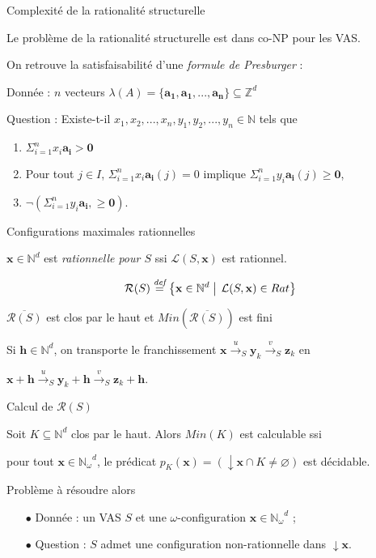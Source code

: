 \documentclass[french]{beamer}
\newcommand{\set}[2]{\left\{#1\mathrel{\left|\vphantom{#1}\vphantom{#2}\right.}#2\right\}}
\newcommand{\defeq}{\ensuremath{\stackrel{\textit{def}}{=}}}
\let\vide\varnothing
\newcommand{\Min}{\textit{Min}}
\newcommand{\N}{\ensuremath{\mathbb{N}}}
\newcommand{\Z}{\ensuremath{\mathbb{Z}}}
\newcommand{\Nomega}{\ensuremath{\mathbb{N}_\omega}}
\newcommand{\lang}{\ensuremath{\mathcal{L}}}
\newcommand{\trans}[2]{\ensuremath{\stackrel{#1}{\longrightarrow}_{#2}}}
\newcommand{\vect}[1]{\ensuremath{\mathbf{#1}}}
\newcommand{\inirat}{\mathcal{R}}
\let\oldemph\emph
\renewcommand{\emph}[1]{\oldemph{\color{blue}#1}}
\begin{document}
\begin{frame}{Complexité de la rationalité structurelle}
\begin{theorem}
Le  problème de la rationalité structurelle est dans co-NP pour les VAS.
\end{theorem}

On retrouve la satisfaisabilité d'une \emph{formule de Presburger} :

\vspace{3mm}
Donnée : $n$ vecteurs $\lambda(A)=\{\vect{a_1}, \vect{a_1}, ..., \vect{a_n}\} \subseteq \Z^d$

Question : Existe-t-il $x_1,x_2,...,x_n, y_1,y_2,...,y_n \in\N$ tels que
\begin{enumerate}
    \item $\Sigma_{i=1}^n x_i \vect{a_i} > \vect{0}$
    \item Pour tout $j \in I$, $\Sigma_{i=1}^n x_i \vect{a_i}(j)=0$ implique $\Sigma_{i=1}^n y_i \vect{a_i}(j) \geq \vect{0}$,
    \item  $\lnot(\Sigma_{i=1}^n y_i \vect{a_i}, \geq \vect{0})$.
\end{enumerate}
\end{frame}


\begin{frame}{Configurations maximales rationnelles}
\begin{definition}
$\vect{x} \in \N^d$ est \emph{rationnelle pour $S$} ssi $\lang(S,\vect{x})$ est rationnel.

$$\inirat(S) \defeq \set{\vect{x} \in \N^d} {\lang(S,\vect{x}) \in Rat}$$
\end{definition}

\begin{theorem}
$\overline{\inirat(S)}$ est clos par le haut et 
$\Min(\overline{\inirat(S)})$ est fini
\end{theorem}

Si $\vect{h}\in\N^d$, on transporte le franchissement $\vect{x} \trans{u}{S} \vect{y}_k \trans{v}{S} \vect{z}_k$ en

$\vect{x} +\vect{h} \trans{u}{S} \vect{y}_k +\vect{h} \trans{v}{S} \vect{z}_k +\vect{h}$.
\end{frame}

\begin{frame}{Calcul de $\inirat(S)$}
\begin{theorem}
Soit $K \subseteq \N^d$ clos par le haut.
Alors $\Min(K)$ est calculable ssi

pour tout $\vect{x} \in \Nomega^d$, le prédicat $p_K(\vect{x}) = (\downarrow \vect{x} \cap K \neq \vide)$ est décidable.
\end{theorem}

\vspace{3mm}
Problème à résoudre alors
\begin{itemize}
	\item[$\bullet$] Donnée : un VAS $S$ et une $\omega$-configuration $\vect{x}\in\Nomega^d$ ;
	\item[$\bullet$] Question : $S$ admet une configuration non-rationnelle dans $\downarrow \vect{x}$.
\end{itemize}
\end{frame}
\end{document}
